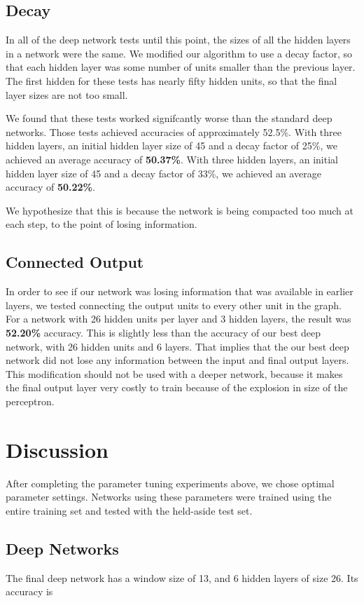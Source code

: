 \documentclass[letterpaper,twocolumn,12pt]{article}
\begin{document}
\subsection{Decay}
In all of the deep network tests until this point, the sizes of all the hidden layers in a network were the same.
We modified our algorithm to use a decay factor, so that each hidden layer was some number of units smaller than the previous layer.
The first hidden for these tests has nearly fifty hidden units, so that the final layer sizes are not too small.

We found that these tests worked signifcantly worse than the standard deep networks.
Those tests achieved accuracies of approximately 52.5\%.
With three hidden layers, an initial hidden layer size of 45 and a decay factor of 25\%, we achieved an average accuracy of \textbf{50.37\%}.
With three hidden layers, an initial hidden layer size of 45 and a decay factor of 33\%, we achieved an average accuracy of \textbf{50.22\%}.

We hypothesize that this is because the network is being compacted too much at each step, to the point of losing information.

\subsection{Connected Output}
In order to see if our network was losing information that was available in earlier layers, we tested connecting the output units to every other unit in the graph.
For a network with 26 hidden units per layer and 3 hidden layers, the result was \textbf{52.20\%} accuracy.
This is slightly less than the accuracy of our best deep network, with 26 hidden units and 6 layers.
That implies that the our best deep network did not lose any information between the input and final output layers.
This modification should not be used with a deeper network, because it makes the final output layer very costly to train because of the explosion in size of the perceptron.


\section{Discussion}
After completing the parameter tuning experiments above, we chose optimal parameter settings.
Networks using these parameters were trained using the entire training set and tested with the held-aside test set.

\subsection{Deep Networks}
The final deep network has a window size of 13, and 6 hidden layers of size 26.
Its accuracy is %
\end{document}
